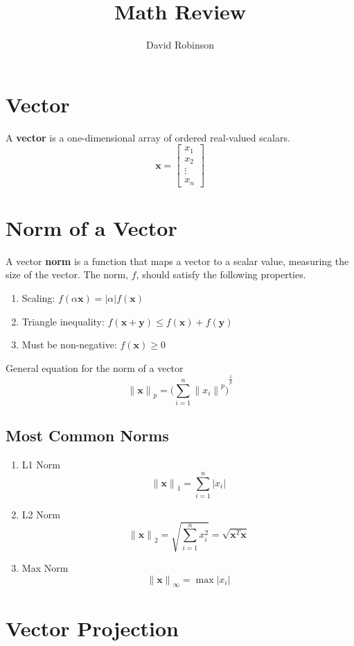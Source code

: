\documentclass{article}
\title{Math Review}
\author{David Robinson}
\date{}
\begin{document}
\maketitle

\section*{Vector}

A \textbf{vector} is a one-dimensional array of ordered real-valued scalars.
\[\mathbf{x}=\begin{bmatrix}
    x_1 \\ x_2 \\ \vdots \\ x_n
\end{bmatrix}\]

\section*{Norm of a Vector}
A vector \textbf{norm} is a function that maps a vector to a scalar value, measuring the size of the vector. The norm, $f$, should satisfy the following properties.
\begin{enumerate}
    \item Scaling: $f(\alpha\mathbf{x})=|\alpha |f(\mathbf{x})$
    \item Triangle inequality: $f(\mathbf{x}+\mathbf{y})\leq f(\mathbf{x}) + f(\mathbf{y})$
    \item Must be non-negative: $f(\mathbf{x})\geq 0$
\end{enumerate}

General equation for the norm of a vector
\[{\|\mathbf{x}\|}_p={\Bigg(\sum_{i=1}^n{\|x_i\|}^p\Bigg)}^\frac{1}{p}\]

\subsection*{Most Common Norms}
\begin{enumerate}
    \item L1 Norm
    \[{\|\mathbf{x}\|}_1 = \sum_{i=1}^n |x_i|\]
    \item L2 Norm
    \[{\|\mathbf{x}\|}_2=\sqrt{\sum_{i=1}^n x_i^2} = \sqrt{\mathbf{x}^T\mathbf{x}}\]
    \item Max Norm
    \[{\|\mathbf{x}\|}_\infty=\max |x_i |\]
\end{enumerate}

\section*{Vector Projection}
\end{document}
